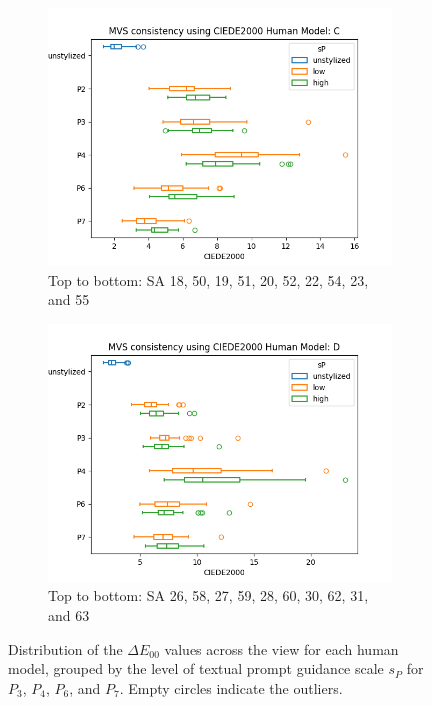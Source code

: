 \begin{figure}[ht]
\begin{subfigure}{0.49\textwidth}
		\includegraphics[width=\linewidth]{Figures/results/good/ciede2000_irene.png}
		\caption{Top to bottom: SA 18, 50, 19, 51, 20, 52, 22, 54, 23, and 55}
		\label{fig:ciede2000_irene}
	\end{subfigure}
	\begin{subfigure}{0.49\textwidth}
		\includegraphics[width=\linewidth]{Figures/results/good/ciede2000_simon.png}
		\caption{Top to bottom: SA 26, 58, 27, 59, 28, 60, 30, 62, 31, and 63}
		\label{fig:ciede2000_simon}
	\end{subfigure}
	\caption{Distribution of the $\Delta E_{00}$ values across the view for each human model, grouped by the level of textual prompt guidance scale $s_P$ for $P_3$, $P_4$, $P_6$, and $P_7$. Empty circles indicate the outliers.}
	\label{fig:quantitative_distribution_ciede2000_good}
\end{figure}

